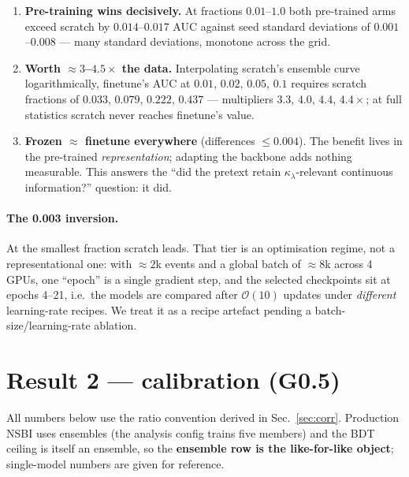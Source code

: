 \documentclass[11pt]{article}
\newcommand{\kl}{\ensuremath{\kappa_\lambda}}
\begin{document}
\begin{enumerate}[leftmargin=2.2em]
\item \textbf{Pre-training wins decisively.} At fractions $0.01$--$1.0$ both pre-trained
  arms exceed scratch by $0.014$--$0.017$ AUC against seed standard deviations of
  $0.001$--$0.008$ --- many standard deviations, monotone across the grid.
\item \textbf{Worth ${\approx}3$--$4.5\times$ the data.} Interpolating scratch's ensemble
  curve logarithmically, finetune's AUC at $0.01$, $0.02$, $0.05$, $0.1$ requires scratch
  fractions of $0.033$, $0.079$, $0.222$, $0.437$ --- multipliers $3.3$, $4.0$, $4.4$,
  $4.4\times$; at full statistics scratch never reaches finetune's value.
\item \textbf{Frozen $\approx$ finetune everywhere} (differences $\le 0.004$). The benefit
  lives in the pre-trained \emph{representation}; adapting the backbone adds nothing
  measurable. This answers the ``did the pretext retain \kl-relevant continuous
  information?'' question: it did.
\end{enumerate}

\paragraph{The 0.003 inversion.} At the smallest fraction scratch leads. That tier is an
optimisation regime, not a representational one: with ${\approx}2$k events and a global
batch of ${\approx}8$k across 4 GPUs, one ``epoch'' is a single gradient step, and the
selected checkpoints sit at epochs 4--21, i.e.\ the models are compared after
$\mathcal{O}(10)$ updates under \emph{different} learning-rate recipes. We treat it as a
recipe artefact pending a batch-size/learning-rate ablation.

\section{Result 2 --- calibration (G0.5)}
\label{sec:closure}

All numbers below use the ratio convention derived in Sec.~\ref{sec:corr}. Production NSBI
uses ensembles (the analysis config trains five members) and the BDT ceiling is itself an
ensemble, so the \textbf{ensemble row is the like-for-like object}; single-model numbers are
given for reference.
\end{document}
